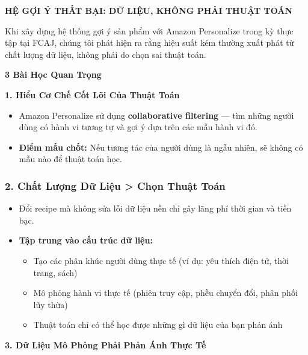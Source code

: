 \vspace{0.5em}\noindent\textbf{HỆ GỢI Ý THẤT BẠI: DỮ LIỆU, KHÔNG PHẢI THUẬT
TOÁN}\par

Khi xây dựng hệ thống gợi ý sản phẩm với Amazon Personalize trong kỳ
thực tập tại FCAJ, chúng tôi phát hiện ra rằng hiệu suất kém thường xuất
phát từ chất lượng dữ liệu, không phải do chọn sai thuật toán.

\vspace{0.5em}\noindent\textbf{3 Bài Học Quan Trọng}\par

\vspace{0.5em}\noindent\textbf{1. Hiểu Cơ Chế Cốt Lõi Của Thuật
Toán}\par

\begin{itemize}
\tightlist
\item
  Amazon Personalize sử dụng \textbf{collaborative filtering} --- tìm
  những người dùng có hành vi tương tự và gợi ý dựa trên các mẫu hành vi
  đó.
\item
  \textbf{Điểm mấu chốt:} Nếu tương tác của người dùng là ngẫu nhiên, sẽ
  không có mẫu nào để thuật toán học.
\end{itemize}

\subsubsection{2. Chất Lượng Dữ Liệu \textgreater{} Chọn Thuật
Toán}

\begin{itemize}
\tightlist
\item
  Đổi recipe mà không sửa lỗi dữ liệu nền chỉ gây lãng phí thời gian và
  tiền bạc.
\item
  \textbf{Tập trung vào cấu trúc dữ liệu:}

  \begin{itemize}
  \tightlist
  \item
    Tạo các phân khúc người dùng thực tế (ví dụ: yêu thích điện tử, thời
    trang, sách)
  \item
    Mô phỏng hành vi thực tế (phiên truy cập, phễu chuyển đổi, phân phối
    lũy thừa)
  \item
    Thuật toán chỉ có thể học được những gì dữ liệu của bạn phản ánh
  \end{itemize}
\end{itemize}

\vspace{0.5em}\noindent\textbf{3. Dữ Liệu Mô Phỏng Phải Phản Ánh Thực
Tế}\par

